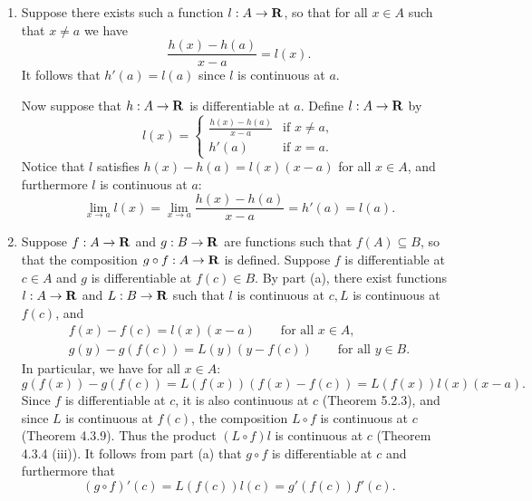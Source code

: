 \documentclass{lew98_solutions}
\begin{document}
\begin{solution}
    \begin{enumerate}
        \item Suppose there exists such a function \( l : A \to \mathbf{R} \), so that for all \( x \in A \) such that \( x \neq a \) we have
        \[
            \frac{h(x) - h(a)}{x - a} = l(x).
        \]
        It follows that \( h'(a) = l(a) \) since \( l \) is continuous at \( a \).

        Now suppose that \( h : A \to \mathbf{R} \) is differentiable at \( a \). Define \( l : A \to \mathbf{R} \) by
        \[
            l(x) = \begin{cases}
                \frac{h(x) - h(a)}{x - a} & \text{if } x \neq a, \\
                h'(a) & \text{if } x = a.
            \end{cases}
        \]
        Notice that \( l \) satisfies \( h(x) - h(a) = l(x) (x - a) \) for all \( x \in A \), and furthermore \( l \) is continuous at \( a \):
        \[
            \lim_{x \to a} l(x) = \lim_{x \to a} \frac{h(x) - h(a)}{x - a} = h'(a) = l(a).
        \]

        \item Suppose \( f : A \to \mathbf{R} \) and \( g : B \to \mathbf{R} \) are functions such that \( f(A) \subseteq B \), so that the composition \( g \circ f : A \to \mathbf{R} \) is defined. Suppose \( f \) is differentiable at \( c \in A \) and \( g \) is differentiable at \( f(c) \in B \). By part (a), there exist functions \( l : A \to \mathbf{R} \) and \( L : B \to \mathbf{R} \) such that \( l \) is continuous at \( c, L \) is continuous at \( f(c) \), and
        \begin{gather*}
            f(x) - f(c) = l(x)(x - a) \qquad \text{for all } x \in A, \\[2mm]
            g(y) - g(f(c)) = L(y)(y - f(c)) \qquad \text{for all } y \in B.
        \end{gather*}
        In particular, we have for all \( x \in A \):
        \[
            g(f(x)) - g(f(c)) = L(f(x))(f(x) - f(c)) = L(f(x))l(x)(x - a).
        \]
        Since \( f \) is differentiable at \( c \), it is also continuous at \( c \) (Theorem 5.2.3), and since \( L \) is continuous at \( f(c) \), the composition \( L \circ f \) is continuous at \( c \) (Theorem 4.3.9). Thus the product \( (L \circ f) l \) is continuous at \( c \) (Theorem 4.3.4 (iii)). It follows from part (a) that \( g \circ f \) is differentiable at \( c \) and furthermore that
        \[
            (g \circ f)'(c) = L(f(c))l(c) = g'(f(c)) f'(c).
        \]
    \end{enumerate}
\end{solution}
\end{document}
